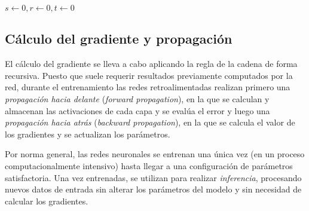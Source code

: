 \begin{algorithm}[tb]
    \SetAlgoLined
    \mydatal{$\rho_1, \rho_2 \in [0, 1)$, tasa de decaimiento exponencial}
    $s \gets 0, r \gets 0, t \gets 0$\;
    \Return{$\theta$}
    \caption{$\texttt{Adam}(\theta, L; \Lambda)$\cite{kingma2014adam}}
    \label{algo:adam}
\end{algorithm}

\subsection{Cálculo del gradiente y propagación}
El cálculo del gradiente se lleva a cabo aplicando la regla de la cadena de forma recursiva. Puesto que suele requerir resultados previamente computados por la red, durante el entrenamiento las redes retroalimentadas realizan primero una \textit{propagación hacia delante} (\textit{forward propagation}), en la que se calculan y almacenan las activaciones de cada capa y se evalúa el error y luego una \textit{propagación hacia atrás} (\textit{backward propagation}), en la que se calcula el valor de los gradientes y se actualizan los parámetros. 

Por norma general, las redes neuronales se entrenan una única vez (en un proceso computacionalmente intensivo) hasta llegar a una configuración de parámetros satisfactoria. Una vez entrenadas, se utilizan para realizar \textit{inferencia}, procesando nuevos datos de entrada sin alterar los parámetros del modelo y sin necesidad de calcular los gradientes.

